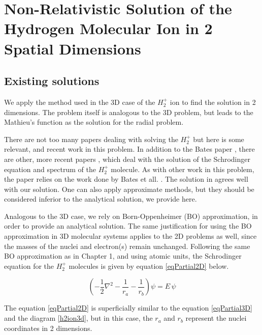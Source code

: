 \chapter{Non-Relativistic Solution of the Hydrogen Molecular Ion in 2 Spatial Dimensions}

\section{Existing solutions}

We apply the method used in the 3D case of the $ H_2^{+} $ ion to find the solution in 2 dimensions. The problem itself is analogous to the 3D problem, but leads to the Mathieu's function as the solution for the radial problem.

There are not too many papers dealing with solving the $ H_2^{+} $ but here is some relevant, and recent work in this problem. In addition to the Bates paper \cite{Bates1}, there are other, more recent papers \cite{H2Plus2d1} \cite{TwoCentersParticle}, \cite{Kolos} which deal with the solution of the Schrodinger equation and spectrum of the $ H_2^{+} $ molecule.  As with other work in this problem, the paper relies on the work done by Bates et all. \cite{Bates1}. The solution in \cite{H2Plus2d1} agrees well with our solution.  One can also apply approximate methods, but they should be considered inferior to the analytical solution, we provide here. 

Analogous to the 3D case, we rely on Born-Oppenheimer (BO) approximation, in order to provide an analytical solution. The same justification for using the BO approximation in 3D molecular systems applies to the 2D problems as well, since the masses of the nuclei and electron(s) remain unchanged.  Following the same BO approximation as in Chapter 1, and using atomic units, the Schrodinger equation for the $ H_2^{+} $ molecules is given by equation \eqref{eqPartial2D} below. 

\begin{equation}\label{eqPartial2D}
\left(-\frac{1}{2}\nabla^2-\frac{1}{r_a}-\frac{1}{r_b}\right)\psi = E\,\psi
\end{equation}

The equation \eqref{eqPartial2D} is superficially similar to the equation \eqref{eqPartial3D} and the diagram \ref{h2ion3d}, but in this case, the $ r_a $ and $ r_b $ represent the nuclei coordinates in 2 dimensions.


